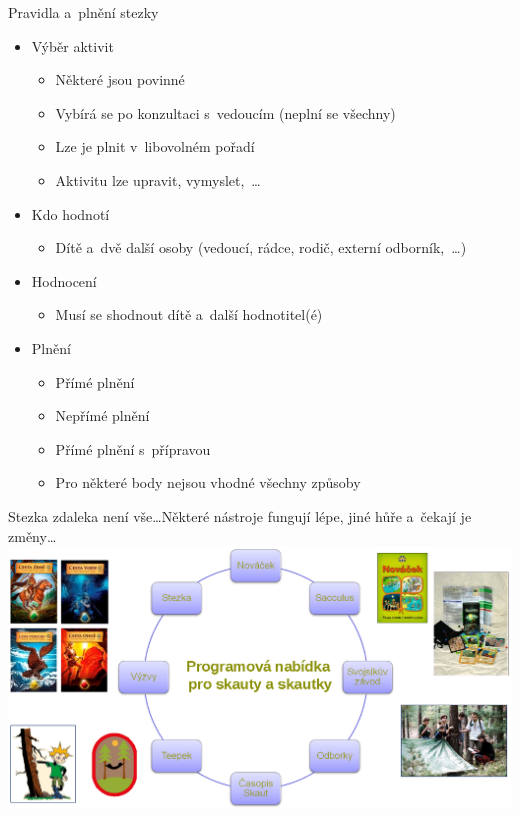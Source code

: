 \documentclass[compress, ucs, xelatex, xcolor=dvipsnames, print,
  hyperref={
    bookmarks=true,
    unicode=true,
    colorlinks=true,
    plainpages=false,
    pdfkeywords={Skaut, Junak, Skauting, Vychovna metoda},
    linkcolor=Black,
    anchorcolor=Black,
    citecolor=OliveGreen,
    filecolor=OliveGreen,
    menucolor=Black,
    urlcolor=OliveGreen,
    pdftex}
  ]{beamer}
\begin{document}
\begin{frame}{Pravidla a~plnění stezky}
  \begin{itemize}
    \item Výběr aktivit
    \begin{itemize}
      \item Některé jsou povinné
      \item Vybírá se po konzultaci s~vedoucím (neplní se všechny)
      \item Lze je plnit v~libovolném pořadí
      \item Aktivitu lze upravit, vymyslet,~\ldots
    \end{itemize}
    \item Kdo hodnotí
    \begin{itemize}
      \item Dítě a~dvě další osoby (vedoucí, rádce, rodič, externí odborník,~\ldots)
    \end{itemize}
    \item Hodnocení
    \begin{itemize}
      \item Musí se shodnout dítě a~další hodnotitel(é)
    \end{itemize}
    \item Plnění
    \begin{itemize}
      \item Přímé plnění
      \item Nepřímé plnění
      \item Přímé plnění s~přípravou
      \item Pro některé body nejsou vhodné všechny způsoby
    \end{itemize}
  \end{itemize}
\end{frame}

\begin{frame}{Stezka zdaleka není vše\ldots}{Některé nástroje fungují lépe, jiné hůře a~čekají je změny\ldots}
  \includegraphics[width=\textwidth]{komplet.png}
\end{frame}
\end{document}
